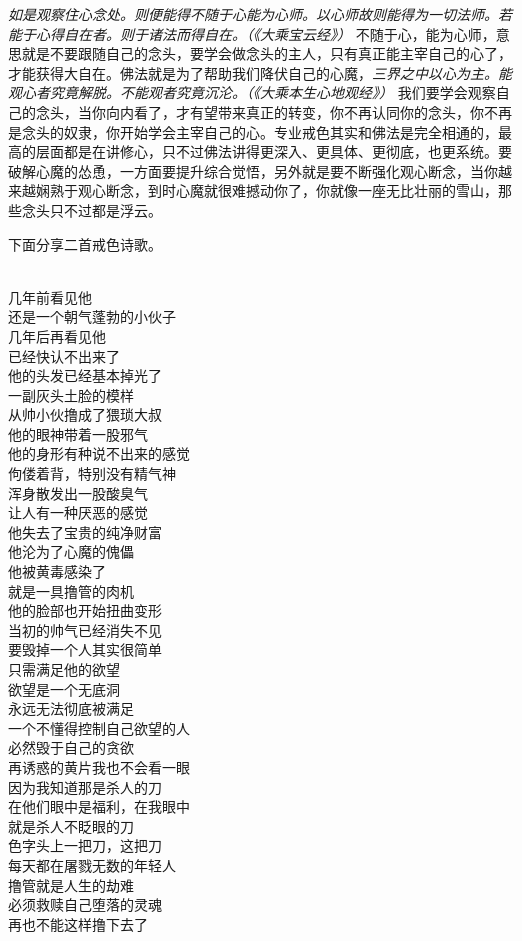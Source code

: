 \textit{如是观察住心念处。则便能得不随于心能为心师。以心师故则能得为一切法师。若能于心得自在者。则于诸法而得自在。（《大乘宝云经》）} 不随于心，能为心师，意思就是不要跟随自己的念头，要学会做念头的主人，只有真正能主宰自己的心了，才能获得大自在。佛法就是为了帮助我们降伏自己的心魔，\textit{三界之中以心为主。能观心者究竟解脱。不能观者究竟沉沦。（《大乘本生心地观经》）} 我们要学会观察自己的念头，当你向内看了，才有望带来真正的转变，你不再认同你的念头，你不再是念头的奴隶，你开始学会主宰自己的心。专业戒色其实和佛法是完全相通的，最高的层面都是在讲修心，只不过佛法讲得更深入、更具体、更彻底，也更系统。要破解心魔的怂恿，一方面要提升综合觉悟，另外就是要不断强化观心断念，当你越来越娴熟于观心断念，到时心魔就很难撼动你了，你就像一座无比壮丽的雪山，那些念头只不过都是浮云。

下面分享二首戒色诗歌。

\begin{poem}[撸劫]
    \begin{multicols}{3}
        \centering~\\
        几年前看见他 \\ 还是一个朝气蓬勃的小伙子 \\ 几年后再看见他 \\ 已经快认不出来了 \\ 他的头发已经基本掉光了 \\ 一副灰头土脸的模样 \\ 从帅小伙撸成了猥琐大叔 \\ 他的眼神带着一股邪气 \\ 他的身形有种说不出来的感觉 \\ 佝偻着背，特别没有精气神 \\ 浑身散发出一股酸臭气 \\ 让人有一种厌恶的感觉 \\ 他失去了宝贵的纯净财富 \\ 他沦为了心魔的傀儡 \\ 他被黄毒感染了 \\ 就是一具撸管的肉机 \\ 他的脸部也开始扭曲变形 \\ 当初的帅气已经消失不见 \\ 要毁掉一个人其实很简单 \\ 只需满足他的欲望 \\ 欲望是一个无底洞 \\ 永远无法彻底被满足 \\ 一个不懂得控制自己欲望的人 \\ 必然毁于自己的贪欲 \\ 再诱惑的黄片我也不会看一眼 \\ 因为我知道那是杀人的刀 \\ 在他们眼中是福利，在我眼中 \\ 就是杀人不眨眼的刀 \\ 色字头上一把刀，这把刀 \\ 每天都在屠戮无数的年轻人 \\ 撸管就是人生的劫难 \\ 必须救赎自己堕落的灵魂 \\ 再也不能这样撸下去了
    \end{multicols}
\end{poem}


